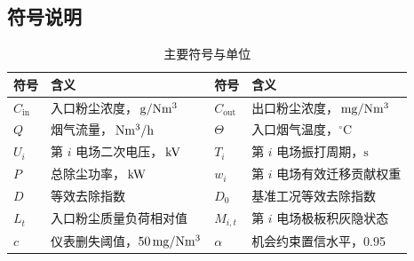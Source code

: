 \subsection{符号说明}

\begin{table}[H]
\centering
\caption{主要符号与单位}
\label{tab:symbols}
\begin{tabularx}{0.96\textwidth}{C{1.9cm}L C{2.2cm}L}
\toprule
符号 & 含义 & 符号 & 含义\\
\midrule
$C_{\mathrm{in}}$ & 入口粉尘浓度，$\,\mathrm{g/Nm^3}$ & $C_{\mathrm{out}}$ & 出口粉尘浓度，$\,\mathrm{mg/Nm^3}$\\
$Q$ & 烟气流量，$\,\mathrm{Nm^3/h}$ & $\Theta$ & 入口烟气温度，$^\circ\mathrm{C}$\\
$U_i$ & 第 $i$ 电场二次电压，$\,\mathrm{kV}$ & $T_i$ & 第 $i$ 电场振打周期，$\mathrm{s}$\\
$P$ & 总除尘功率，$\,\mathrm{kW}$ & $w_i$ & 第 $i$ 电场有效迁移贡献权重\\
$D$ & 等效去除指数 & $D_0$ & 基准工况等效去除指数\\
$L_t$ & 入口粉尘质量负荷相对值 & $M_{i,t}$ & 第 $i$ 电场极板积灰隐状态\\
$c$ & 仪表删失阈值，$50\,\mathrm{mg/Nm^3}$ & $\alpha$ & 机会约束置信水平，0.95\\
\bottomrule
\end{tabularx}
\end{table}
